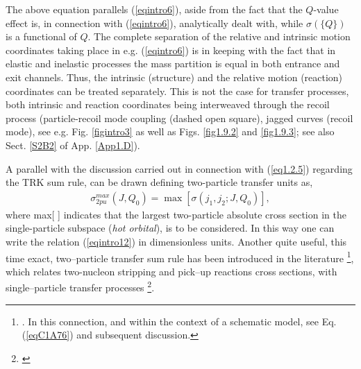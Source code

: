 The above equation parallels (\ref{eqintro6}), aside from the fact that the $Q$-value effect is, in connection with (\ref{eqintro6}), analytically dealt with, while $\sigma(\{Q\})$ is a functional of $Q$. The complete separation of the relative and intrinsic motion coordinates taking place in e.g. (\ref{eqintro6}) is in keeping with the fact that in elastic and inelastic processes the mass partition is equal in both entrance and exit channels. Thus, the intrinsic (structure) and the relative motion (reaction) coordinates can be treated separately. This is not the case for transfer processes, both intrinsic and reaction coordinates being interweaved through the recoil process (particle-recoil mode coupling (dashed open square),  jagged curves (recoil mode), see e.g.  Fig.  \ref{figintro3} as well as Figs. \ref{fig1.9.2} and \ref{fig1.9.3}; see also Sect. \ref{S2B2} of App. \ref{App1.D}). 





A parallel with the discussion carried out in connection with (\ref{eq1.2.5}) regarding the TRK sum rule, can be drawn defining two-particle transfer units as,
\begin{align}
\sigma^{max}_{2pu}(J,Q_0)=\max \left[\sigma(j_1,j_2;J,Q_0)\right],
\end{align}
where max[ ] indicates that the largest two-particle absolute cross section in the single-particle subspace (\textit{hot orbital}), is to be considered. In this way one can write the relation (\ref{eqintro12}) in dimensionless units.  Another quite useful, this time exact, two--particle transfer sum rule has been introduced in the literature \footnote{\cite{Bayman:72}. In this connection, and within the context of a schematic model, see Eq. (\ref{eqC1A76}) and subsequent discussion.}, which relates two-nucleon stripping and pick--up reactions cross sections, with single--particle transfer processes \footnote{\cite{Lanford:77}}.


